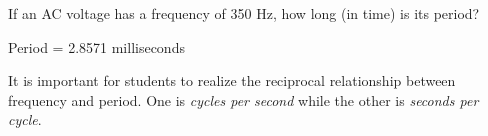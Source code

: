 

If an AC voltage has a frequency of 350 Hz, how long (in time) is its period?







Period = 2.8571 milliseconds







It is important for students to realize the reciprocal relationship between frequency and period.  One is {\it cycles per second} while the other is {\it seconds per cycle}.




